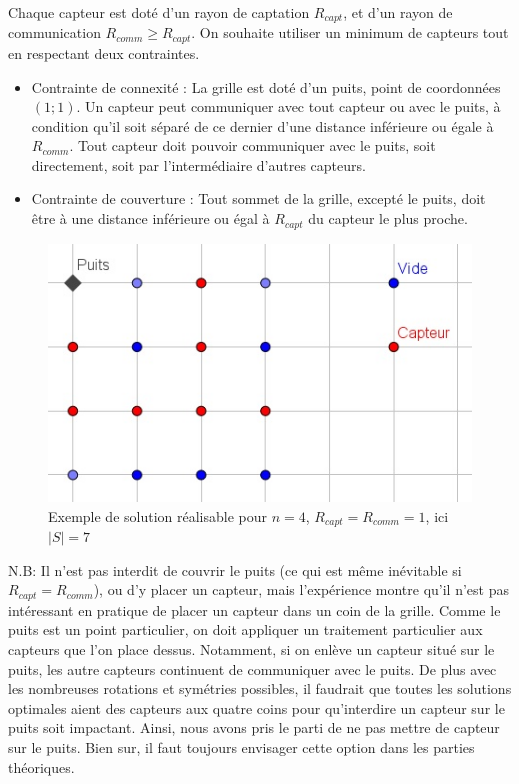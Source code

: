 \documentclass[12pt,a4paper]{article}
\begin{document}
Chaque capteur est doté d'un rayon de captation $R_{capt}$, et d'un rayon de communication $R_{comm}\geq R_{capt}$.  On souhaite utiliser un minimum de capteurs tout en respectant deux contraintes.
\begin{itemize}
\item Contrainte de connexité : La grille est doté d'un puits, point de coordonnées $(1;1)$. Un capteur peut communiquer avec tout capteur ou avec le puits, à condition qu'il soit séparé de ce dernier d'une distance inférieure ou égale à $R_{comm}$. Tout capteur doit pouvoir communiquer avec le puits, soit directement, soit par l'intermédiaire d'autres capteurs. 

\item Contrainte de couverture : Tout sommet de la grille, excepté le puits, doit être à une distance inférieure ou égal à $R_{capt}$ du capteur le plus proche.

\end{itemize}
\begin{figure}[h]
\center
\includegraphics[scale=1]{Images/4_1_1_realisable.jpg}
\caption{Exemple de solution réalisable pour $n=4$, $R_{capt}=R_{comm}=1$, ici $|S|=7$}
\end{figure}
N.B: Il n'est pas interdit de couvrir le puits (ce qui est même inévitable si $R_{capt}=R_{comm}$), ou d'y placer un capteur, mais l'expérience montre qu'il n'est pas intéressant en pratique de placer un capteur dans un coin de la grille. Comme le puits est un point particulier, on doit appliquer un traitement particulier aux capteurs que l'on place dessus.
 Notamment, si on enlève un capteur situé sur le puits, les autre capteurs continuent de communiquer avec le puits. De plus avec les nombreuses rotations et symétries possibles, il faudrait que toutes les solutions optimales aient des capteurs aux quatre coins pour qu'interdire un capteur sur le puits soit impactant. Ainsi, nous avons pris le parti de ne pas mettre de capteur sur le puits. Bien sur, il faut toujours envisager cette option dans les parties théoriques. 
\end{document}
